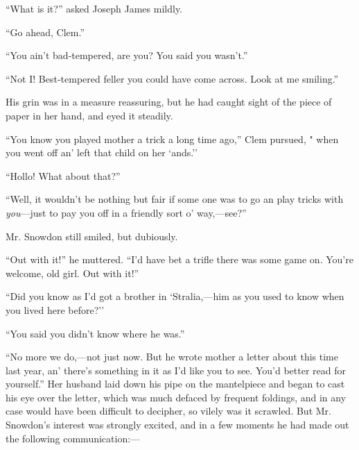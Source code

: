 {}``What is it?'' asked Joseph James mildly.

``Go ahead, Clem.''

``You ain't bad-tempered, are you? You said you wasn't.''

``Not I! Best-tempered feller you could have come across. Look at me
smiling.''

His grin was in a measure reassuring, but he had caught sight of the
piece of paper in her hand, and eyed it steadily.

``You know you played mother a trick a long time ago,'' Clem pursued, "
when you went off an' left that child on her `ands.''

``Hollo! What about that?''

``Well, it wouldn't be nothing but fair if some one was to go an play
tricks with \emph{you}---just to pay you off in a friendly sort o'
way,---see?''

Mr. Snowdon still smiled, but dubiously.

``Out with it!'' he muttered. ``I'd have bet a trifle there was some
game on. You're welcome, old girl. Out with it!''

``Did you know as I'd got a brother in `Stralia,---him as you used to
know when you lived here before?''

{}``You said you didn't know where he was.''

``No more we do,---not just now. But he wrote mother a letter about this
time last year, an' there's something in it as I'd like you to see.
You'd better read for yourself.'' Her husband laid down his pipe on the
mantelpiece and began to cast his eye over the letter, which was much
defaced by frequent foldings, and in any case would have been difficult
to decipher, so vilely was it scrawled. But Mr. Snowdon's interest was
strongly excited, and in a few moments he had made out the following
communication:---

